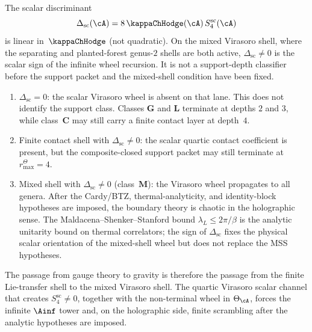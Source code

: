 \begin{remark}
\label{rem:scrambling-dichotomy}%
%
%
The scalar discriminant
\[
\Delta_{\mathrm{sc}}(\cA)
=8\,\kappaChHodge(\cA)\,S^{\mathrm{sc}}_4(\cA)
\]
is linear in~\(\kappaChHodge\) (not quadratic). On the mixed Virasoro
shell, where the separating and planted-forest genus-$2$ shells are
both active, \(\Delta_{\mathrm{sc}}\ne0\) is the scalar sign of the
infinite wheel recursion. It is not a support-depth classifier before
the support packet and the mixed-shell condition have been fixed.
\begin{enumerate}
\item \(\Delta_{\mathrm{sc}}=0\): the scalar Virasoro wheel is absent
 on that lane.  This does not identify the support class.  Classes
 \(\mathbf G\) and \(\mathbf L\) terminate at depths \(2\) and \(3\),
 while class~\(\mathbf C\) may still carry a finite contact layer at
 depth~\(4\).
\item Finite contact shell with \(\Delta_{\mathrm{sc}}\ne0\):
 the scalar quartic contact coefficient is present, but the
 composite-closed support packet may still terminate at
 \(r^\Theta_{\max}=4\).
\item Mixed shell with \(\Delta_{\mathrm{sc}}\ne0\)
 \textup{(}class~$\mathbf{M}$\textup{)}: the Virasoro wheel propagates
 to all genera.  After the Cardy/BTZ, thermal-analyticity, and
 identity-block hypotheses are imposed, the boundary theory is chaotic
 in the holographic sense.  The Maldacena--Shenker--Stanford bound
 $\lambda_L \le 2\pi/\beta$ is the analytic unitarity bound on thermal
 correlators; the sign of \(\Delta_{\mathrm{sc}}\) fixes the physical
 scalar orientation of the mixed-shell wheel but does not replace the
 MSS hypotheses.
\end{enumerate}
The passage from gauge theory to gravity is therefore the passage
from the finite Lie-transfer shell to the mixed Virasoro shell.  The
quartic Virasoro scalar channel that creates
\(S^{\mathrm{sc}}_4\ne0\), together with the non-terminal wheel in
\(\Theta_\cA\), forces the infinite \(\Ainf\) tower and, on the
holographic side, finite scrambling after the analytic hypotheses are
imposed.
\end{remark}


